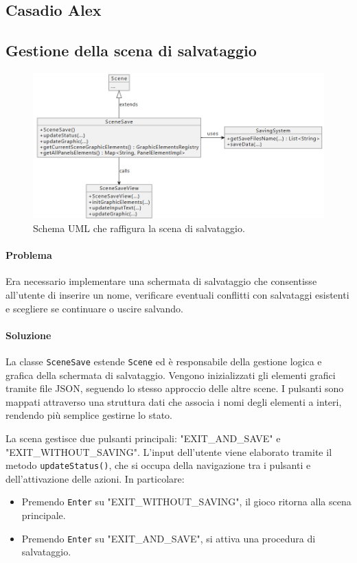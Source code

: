 \documentclass[a4paper,12pt]{report}
\begin{document}
{{\subsection{Casadio Alex}
\subsection*{Gestione della scena di salvataggio}

\begin{figure}[H]
\centering{}
\includegraphics[width=\textwidth]{immagini/sceneSaveUml.png}
\caption{Schema UML che raffigura la scena di salvataggio. }
\label{immagini/MenuLoadBoxuml.png}
\end{figure}

\paragraph{Problema}
Era necessario implementare una schermata di salvataggio che consentisse all’utente di inserire un nome, verificare eventuali conflitti con salvataggi esistenti e scegliere se continuare o uscire salvando.

\paragraph{Soluzione}
La classe \texttt{SceneSave} estende \texttt{Scene} ed è responsabile della gestione logica e grafica della schermata di salvataggio. Vengono inizializzati gli elementi grafici tramite file JSON, seguendo lo stesso approccio delle altre scene. I pulsanti sono mappati attraverso una struttura dati che associa i nomi degli elementi a interi, rendendo più semplice gestirne lo stato.\

La scena gestisce due pulsanti principali: "EXIT\_AND\_SAVE" e \linebreak "EXIT\_WITHOUT\_SAVING". L'input dell'utente viene elaborato tramite il metodo \texttt{updateStatus()}, che si occupa della navigazione tra i pulsanti e dell’attivazione delle azioni. In particolare:
\begin{itemize}
\item Premendo \texttt{Enter} su "EXIT\_WITHOUT\_SAVING", il gioco ritorna alla scena principale.
\item Premendo \texttt{Enter} su "EXIT\_AND\_SAVE", si attiva una procedura di salvataggio.
\end{itemize}

}}
\end{document}
